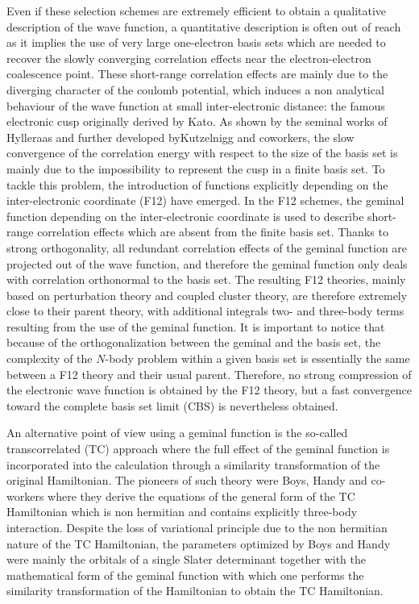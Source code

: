 \documentclass[aip,jcp,reprint,noshowkeys,superscriptaddress]{revtex4-1}
\begin{document}
Even if these selection schemes are extremely efficient to obtain a qualitative description of the wave function, a quantitative description is often out of reach as it implies the use of very large one-electron basis sets which are needed to recover the slowly converging correlation effects near the electron-electron coalescence point. 
These short-range correlation effects are mainly due to the diverging character of the coulomb potential, which induces a non analytical behaviour of the wave function at small inter-electronic distance: the famous electronic cusp originally derived by Kato\cite{Kat-CPAM-57}. As shown by the seminal works of Hylleraas \cite{Hyl-ZP-29} and further developed byKutzelnigg and coworkers, \cite{Kut-TCA-85,KutKlo-JCP-91, NogKut-JCP-94} the slow convergence of the correlation energy with respect to the size of the basis set is mainly due to the impossibility to represent the cusp in a finite basis set. 
To tackle this problem, the introduction of functions explicitly depending on the inter-electronic coordinate (F12) have emerged\cite{Ten-TCA-12,TenNog-WIREs-12,HatKloKohTew-CR-12, KonBisVal-CR-12, GruHirOhnTen-JCP-17, MaWer-WIREs-18}. 
In the F12 schemes, the geminal function depending on the inter-electronic coordinate is used to describe short-range correlation effects which are absent from the finite basis set. Thanks to strong orthogonality, 
all redundant correlation effects of the geminal function are projected out of the wave function, 
and therefore the geminal function only deals with correlation orthonormal to the basis set. 
The resulting F12 theories, mainly based on perturbation theory and coupled cluster theory, are therefore 
extremely close to their parent theory, with additional integrals two- and three-body terms resulting from the use of the geminal function. 
It is important to notice that because of the orthogonalization between the geminal and the basis set, 
the complexity of the $N$-body problem within a given basis set is essentially the same between a F12 theory and their usual parent. Therefore, no strong compression of the electronic wave function is obtained by the F12 theory, 
but a fast convergence toward the complete basis set limit (CBS) is nevertheless obtained.  

An alternative point of view using a geminal function is the so-called transcorrelated (TC) approach where the full effect of the geminal function is incorporated into the calculation through a similarity transformation of the original Hamiltonian. 
The pioneers of such theory were Boys, Handy and co-workers\cite{BoyHan-PRSLA-69,BoyHanLin-1-PRSLA-69,BoyHanLin-2-PRSLA-69} where they derive the equations of the general form of the TC Hamiltonian which is non hermitian and contains explicitly three-body interaction. Despite the loss of variational principle due to the non hermitian nature of the TC Hamiltonian, the parameters optimized by Boys and Handy were mainly the orbitals of a single Slater determinant together with the mathematical form of the geminal function with which one performs the similarity transformation of the Hamiltonian to obtain the TC Hamiltonian. 
\end{document}
